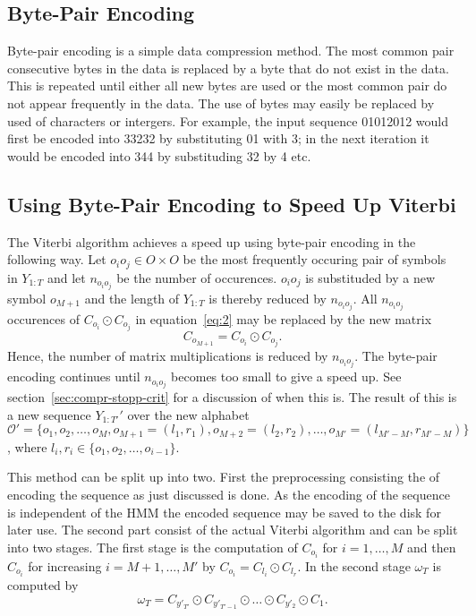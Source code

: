 \subsection{Byte-Pair Encoding}

Byte-pair encoding is a simple data compression method. The most common pair
consecutive bytes in the data is replaced by a byte that do not exist in the
data. This is repeated until either all new bytes are used or the most common
pair do not appear frequently in the data. The use of bytes may easily be
replaced by used of characters or intergers. For example, the input sequence
01012012 would first be encoded into 33232 by substituting 01 with 3; in the
next iteration it would be encoded into 344 by substituding 32 by 4 etc.

\subsection{Using Byte-Pair Encoding to Speed Up Viterbi}

The Viterbi algorithm achieves a speed up using byte-pair encoding in the
following way. Let $o_i o_j \in O \times O$ be the most frequently occuring
pair of symbols in $Y_{1:T}$ and let $n_{o_i o_j}$ be the number of
occurences. $o_i o_j$ is substituded by a new symbol $o_{M + 1}$ and the length
of $Y_{1:T}$ is thereby reduced by $n_{o_i o_j}$. All $n_{o_i o_j}$ occurences
of $C_{o_i} \odot C_{o_j}$ in equation~\eqref{eq:2} may be replaced by the new
matrix
\begin{equation*}
  C_{o_{M + 1}} = C_{o_i} \odot C_{o_j}.
\end{equation*}
Hence, the number of matrix multiplications is reduced by $n_{o_i o_j}$. The
byte-pair encoding continues until $n_{o_i o_j}$ becomes too small to give a
speed up. See section~\ref{sec:compr-stopp-crit} for a discussion of when this
is. The result of this is a new sequence $Y_{1:T'}'$ over the new alphabet
$\mathcal{O}' = \{o_1, o_2, \dots, o_M, o_{M + 1} = (l_1, r_1), o_{M + 2} =
(l_2, r_2), \dots, o_{M'} = (l_{M' - M}, r_{M' - M}) \}$,
where $l_i, r_i \in \{ o_1, o_2, \dots, o_{i - 1} \}$.

This method can be split up into two. First the preprocessing consisting the of
encoding the sequence as just discussed is done. As the encoding of the
sequence is independent of the HMM the encoded sequence may be saved to the
disk for later use. The second part consist of the actual Viterbi algorithm
and can be split into two stages. The first stage is the computation of
$C_{o_i}$ for $i = 1, \dots, M$ and then $C_{o_i}$ for increasing
$i = M + 1, \dots, M'$ by $C_{o_i} = C_{l_i} \odot C_{l_r}$. In the second
stage $\omega_T$ is computed by
\begin{equation}
  \label{eq:3}
  \omega_T = C_{y'_{T'}} \odot C_{y'_{T'-1}} \odot \dots \odot C_{y'_2} \odot C_1.
\end{equation}

